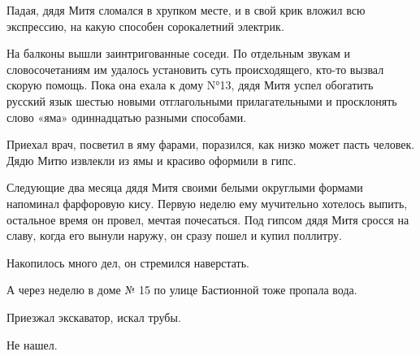 Падая, дядя Митя сломался в хрупком месте, и в свой крик вложил всю экспрессию,
на какую способен сорокалетний электрик.

На балконы вышли заинтригованные соседи. По отдельным звукам и словосочетаниям
им удалось установить суть происходящего, кто-то вызвал скорую помощь. Пока она
ехала к дому N°13, дядя Митя успел обогатить русский язык шестью новыми
отглагольными прилагательными и просклонять слово «яма» одиннадцатью разными
способами.

Приехал врач, посветил в яму фарами, поразился, как низко может пасть человек.
Дядю Митю извлекли из ямы и красиво оформили в гипс.

Следующие два месяца дядя Митя своими белыми округлыми формами напоминал
фарфоровую кису. Первую неделю ему мучительно хотелось выпить, остальное время
он провел, мечтая почесаться. Под гипсом дядя Митя сросся на славу, когда его
вынули наружу, он сразу пошел и купил поллитру.

Накопилось много дел, он стремился наверстать.

А через неделю в доме № 15 по улице Бастионной тоже пропала вода.

Приезжал экскаватор, искал трубы.

Не нашел.


